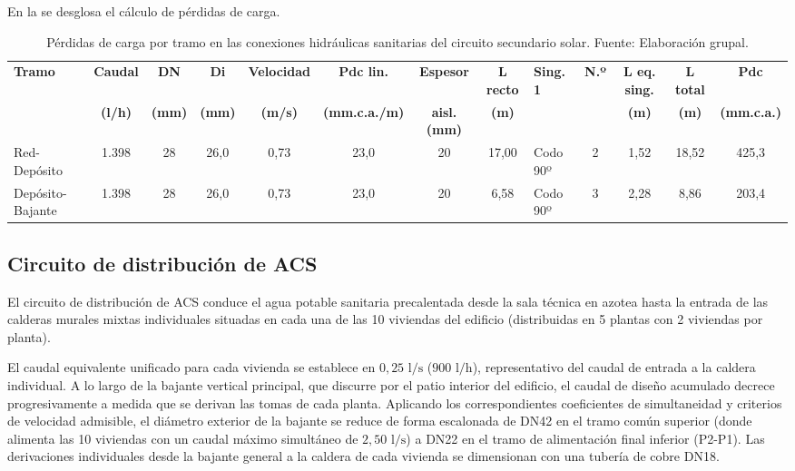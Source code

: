 \documentclass[12pt]{article}
\begin{document}
En la  se desglosa el cálculo de pérdidas de carga.
\begin{landscape}
\begin{table}[p]
\centering
\footnotesize
\setlength{\tabcolsep}{2pt}
\caption{Pérdidas de carga por tramo en las conexiones hidráulicas sanitarias del circuito secundario solar. Fuente: Elaboración grupal.}
\label{tab:pdc_secundario}
\begin{tabular}{lccccccclcccc}
\toprule
\textbf{Tramo} & \textbf{Caudal} & \textbf{DN} & \textbf{Di} & \textbf{Velocidad} & \textbf{Pdc lin.} & \textbf{Espesor} & \textbf{L recto} & \textbf{Sing. 1} & \textbf{N.º} & \textbf{L eq. sing.} & \textbf{L total} & \textbf{Pdc} \\
 & \textbf{(l/h)} & \textbf{(mm)} & \textbf{(mm)} & \textbf{(m/s)} & \textbf{(mm.c.a./m)} & \textbf{aisl. (mm)} & \textbf{(m)} & & & \textbf{(m)} & \textbf{(m)} & \textbf{(mm.c.a.)} \\
\midrule
Red-Depósito & 1.398 & 28 & 26,0 & 0,73 & 23,0 & 20 & 17,00 & Codo 90º & 2 & 1,52 & 18,52 & 425,3 \\
Depósito-Bajante & 1.398 & 28 & 26,0 & 0,73 & 23,0 & 20 & 6,58 & Codo 90º & 3 & 2,28 & 8,86 & 203,4 \\
\bottomrule
\end{tabular}
\end{table}
\end{landscape}

\subsection{Circuito de distribución de ACS}
\label{subsec:circuito_distribucion_acs}

El circuito de distribución de ACS conduce el agua potable sanitaria precalentada desde la sala técnica en azotea hasta la entrada de las calderas murales mixtas individuales situadas en cada una de las 10 viviendas del edificio (distribuidas en 5 plantas con 2 viviendas por planta).

El caudal equivalente unificado para cada vivienda se establece en $0,25\text{ l/s}$ ($900\text{ l/h}$), representativo del caudal de entrada a la caldera individual. A lo largo de la bajante vertical principal, que discurre por el patio interior del edificio, el caudal de diseño acumulado decrece progresivamente a medida que se derivan las tomas de cada planta. Aplicando los correspondientes coeficientes de simultaneidad y criterios de velocidad admisible, el diámetro exterior de la bajante se reduce de forma escalonada de DN42 en el tramo común superior (donde alimenta las 10 viviendas con un caudal máximo simultáneo de $2,50\text{ l/s}$) a DN22 en el tramo de alimentación final inferior (P2-P1). Las derivaciones individuales desde la bajante general a la caldera de cada vivienda se dimensionan con una tubería de cobre DN18.
\end{document}
